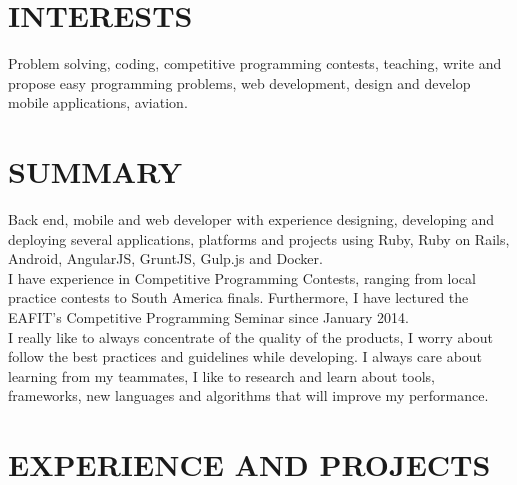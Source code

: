 \documentclass[margin, 10pt]{res} %
\begin{document}
\begin{resume}


\section{INTERESTS}

Problem solving, coding, competitive programming contests, teaching, write and propose easy
programming problems, web development, design and develop mobile applications, aviation.


\section{SUMMARY}

Back end, mobile and web developer with experience designing, developing and deploying several
applications, platforms and projects using Ruby, Ruby on Rails, Android, AngularJS, GruntJS, Gulp.js
and Docker. \\
\newline
I have experience in Competitive Programming Contests, ranging from local practice contests to
South America finals. Furthermore, I have lectured the EAFIT's Competitive Programming Seminar
since January 2014. \\
\newline
I really like to always concentrate of the quality of the products, I worry about follow the best
practices and guidelines while developing. I always care about learning from my teammates, I like
to research and learn about tools, frameworks, new languages and algorithms that will improve my
performance.


\section{EXPERIENCE AND PROJECTS}


\end{resume}
\end{document}

